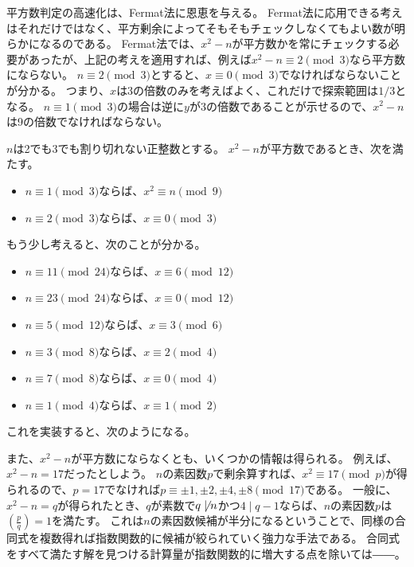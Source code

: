 平方数判定の高速化は、Fermat法に恩恵を与える。
Fermat法に応用できる考えはそれだけではなく、平方剰余によってそもそもチェックしなくてもよい数が明らかになるのである。
Fermat法では、$x^2-n$が平方数かを常にチェックする必要があったが、上記の考えを適用すれば、例えば$x^2-n\equiv2\pmod{3}$なら平方数にならない。
$n\equiv2\pmod{3}$とすると、$x\equiv0\pmod{3}$でなければならないことが分かる。
つまり、$x$は3の倍数のみを考えばよく、これだけで探索範囲は$1/3$となる。
$n\equiv1\pmod{3}$の場合は逆に$y$が3の倍数であることが示せるので、$x^2-n$は9の倍数でなければならない。

\begin{Prop}{}{}
$n$は2でも3でも割り切れない正整数とする。
$x^2-n$が平方数であるとき、次を満たす。
\begin{itemize}
 \item $n \equiv 1 \pmod{3}$ならば、$x^2 \equiv n \pmod{9}$
 \item $n \equiv 2 \pmod{3}$ならば、$x \equiv 0 \pmod{3}$
\end{itemize}
\end{Prop}

もう少し考えると、次のことが分かる。

\begin{itemize}
 \item $n \equiv 11 \pmod{24}$ならば、$x \equiv 6 \pmod{12}$
 \item $n \equiv 23 \pmod{24}$ならば、$x \equiv 0 \pmod{12}$
 \item $n \equiv 5 \pmod{12}$ならば、$x \equiv 3 \pmod{6}$
 \item $n \equiv 3 \pmod{8}$ならば、$x \equiv 2 \pmod{4}$
 \item $n \equiv 7 \pmod{8}$ならば、$x \equiv 0 \pmod{4}$
 \item $n \equiv 1 \pmod{4}$ならば、$x \equiv 1 \pmod{2}$
\end{itemize}

これを実装すると、次のようになる。


また、$x^2-n$が平方数にならなくとも、いくつかの情報は得られる。
例えば、$x^2-n=17$だったとしよう。
$n$の素因数$p$で剰余算すれば、$x^2\equiv17\pmod{p}$が得られるので、$p=17$でなければ$p\equiv\pm1,\pm2,\pm4,\pm8\pmod{17}$である。
一般に、$x^2-n=q$が得られたとき、$q$が素数で$q \not\mid n$かつ$4 \mid q-1$ならば、$n$の素因数$p$は$\left(\frac{p}{q}\right)=1$を満たす。
これは$n$の素因数候補が半分になるということで、同様の合同式を複数得れば指数関数的に候補が絞られていく強力な手法である。
合同式をすべて満たす解を見つける計算量が指数関数的に増大する点を除いては――。

